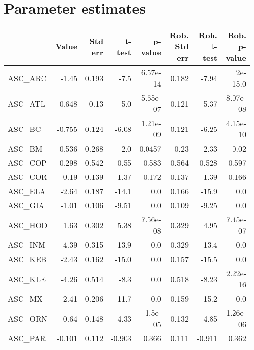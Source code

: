 \section{Parameter estimates}
\begin{tabular}{lrrrrrrr}
\toprule
{} &  Value &  Std err &  t-test &  p-value &  Rob. Std err &  Rob. t-test &  Rob. p-value \\
\midrule
ASC\_ARC             &  -1.45 &    0.193 &    -7.5 & 6.57e-14 &         0.182 &        -7.94 &       2e-15.0 \\
ASC\_ATL             & -0.648 &     0.13 &    -5.0 & 5.65e-07 &         0.121 &        -5.37 &      8.07e-08 \\
ASC\_BC              & -0.755 &    0.124 &   -6.08 & 1.21e-09 &         0.121 &        -6.25 &      4.15e-10 \\
ASC\_BM              & -0.536 &    0.268 &    -2.0 &   0.0457 &          0.23 &        -2.33 &          0.02 \\
ASC\_COP             & -0.298 &    0.542 &   -0.55 &    0.583 &         0.564 &       -0.528 &         0.597 \\
ASC\_COR             &  -0.19 &    0.139 &   -1.37 &    0.172 &         0.137 &        -1.39 &         0.166 \\
ASC\_ELA             &  -2.64 &    0.187 &   -14.1 &      0.0 &         0.166 &        -15.9 &           0.0 \\
ASC\_GIA             &  -1.01 &    0.106 &   -9.51 &      0.0 &         0.109 &        -9.25 &           0.0 \\
ASC\_HOD             &   1.63 &    0.302 &    5.38 & 7.56e-08 &         0.329 &         4.95 &      7.45e-07 \\
ASC\_INM             &  -4.39 &    0.315 &   -13.9 &      0.0 &         0.329 &        -13.4 &           0.0 \\
ASC\_KEB             &  -2.43 &    0.162 &   -15.0 &      0.0 &         0.157 &        -15.5 &           0.0 \\
ASC\_KLE             &  -4.26 &    0.514 &    -8.3 &      0.0 &         0.518 &        -8.23 &      2.22e-16 \\
ASC\_MX              &  -2.41 &    0.206 &   -11.7 &      0.0 &         0.159 &        -15.2 &           0.0 \\
ASC\_ORN             &  -0.64 &    0.148 &   -4.33 &  1.5e-05 &         0.132 &        -4.85 &      1.26e-06 \\
ASC\_PAR             & -0.101 &    0.112 &  -0.903 &    0.366 &         0.111 &       -0.911 &         0.362 \\

\end{tabular}
